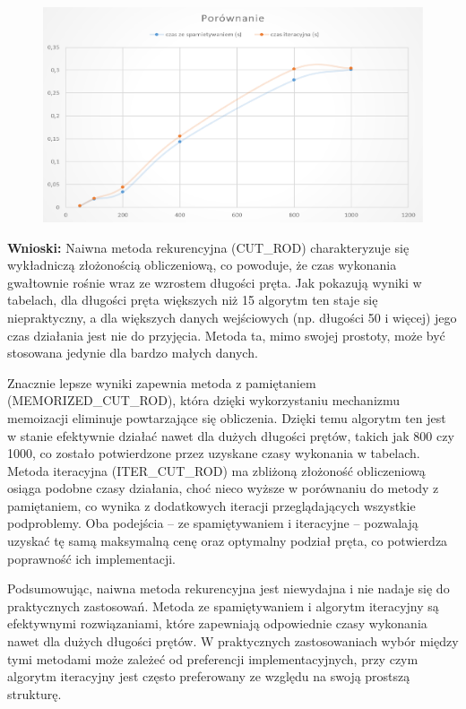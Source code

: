\documentclass{article}
\theoremstyle{definition}
\begin{document}
	\begin{figure}[H]	
		\centering
		\includegraphics[width=1.0\textwidth]{w2.png} 
	\end{figure}
	\textbf{Wnioski:} Naiwna metoda rekurencyjna (CUT\_ROD) charakteryzuje się wykładniczą złożonością obliczeniową, co powoduje, że czas wykonania gwałtownie rośnie wraz ze wzrostem długości pręta. Jak pokazują wyniki w tabelach, dla długości pręta większych niż 15 algorytm ten staje się niepraktyczny, a dla większych danych wejściowych (np. długości 50 i więcej) jego czas działania jest nie do przyjęcia. Metoda ta, mimo swojej prostoty, może być stosowana jedynie  dla bardzo małych danych.
	
	Znacznie lepsze wyniki zapewnia metoda z pamiętaniem (MEMORIZED\_CUT\_ROD), która dzięki wykorzystaniu mechanizmu memoizacji eliminuje powtarzające się obliczenia. Dzięki temu algorytm ten jest w stanie efektywnie działać nawet dla dużych długości prętów, takich jak 800 czy 1000, co zostało potwierdzone przez uzyskane czasy wykonania w tabelach. Metoda iteracyjna (ITER\_CUT\_ROD) ma zbliżoną złożoność obliczeniową osiąga podobne czasy działania, choć nieco wyższe w porównaniu do metody z pamiętaniem, co wynika z dodatkowych iteracji przeglądających wszystkie podproblemy. Oba podejścia – ze spamiętywaniem i iteracyjne – pozwalają uzyskać tę samą maksymalną cenę oraz optymalny podział pręta, co potwierdza poprawność ich implementacji.
	
	Podsumowując, naiwna metoda rekurencyjna jest niewydajna i nie nadaje się do praktycznych zastosowań. Metoda ze spamiętywaniem i algorytm iteracyjny są efektywnymi rozwiązaniami, które zapewniają odpowiednie czasy wykonania nawet dla dużych długości prętów. W praktycznych zastosowaniach wybór między tymi metodami może zależeć od preferencji implementacyjnych, przy czym algorytm iteracyjny jest często preferowany ze względu na swoją prostszą strukturę. 
\end{document}

